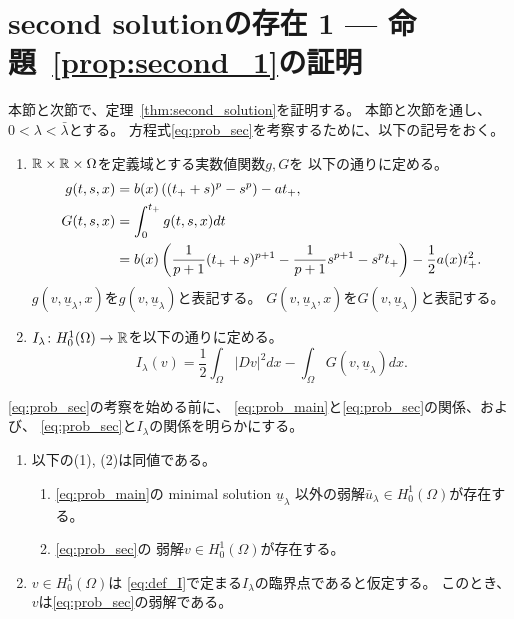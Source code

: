 \section{second solutionの存在 1 --- 命題~\ref{prop:second_1}の証明}

本節と次節で、定理~\ref{thm:second_solution}を証明する。
本節と次節を通し、$0 < \lambda < \bar{\lambda}$とする。
方程式\ref{eq:prob_sec}を考察するために、以下の記号をおく。

\begin{nota}
 \begin{enumerate}[1.]
  \item $\mathbb{R} \times \mathbb{R} \times \Omega$を定義域とする実数値関数$g, G$を
        以下の通りに定める。
        \begin{align}
         g(t, s, x) &= b(x) \left( (t_+ + s)^p - s^p \right) - a t_+, 
         \label{eq:def_g} \\
         G(t, s, x) &= \int_0^{t_+} g(t, s, x) dt
         \notag \\
         &= b(x) \left( \frac{1}{p+1} (t_+ + s)^{p+1} - \frac{1}{p+1}
         s^{p+1} - s^p t_+ \right) - \frac{1}{2} a(x) t_+^2.
         \label{eq:def_G}
        \end{align}
        $g(v, \underline{u}_\lambda, x)$を$g(v, \underline{u}_\lambda
        )$と表記する。
        $G(v,\underline{u}_\lambda, x)$を$G(v, \underline{u}_\lambda
        )$と表記する。
  \item $I_{\lambda} \colon H_0^1(\Omega) \to \mathbb{R}$を以下の通りに定める。
        \begin{equation}
         I_\lambda (v) = \frac{1}{2} \int_\Omega \lvert Dv \rvert^2 dx
          - \int_\Omega G(v, \underline{u}_\lambda) dx. \label{eq:def_I}
        \end{equation}
 \end{enumerate}
\end{nota}

\ref{eq:prob_sec}の考察を始める前に、
\ref{eq:prob_main}と\ref{eq:prob_sec}の関係、および、
\ref{eq:prob_sec}と$I_\lambda$の関係を明らかにする。

\begin{lem}
 \begin{enumerate}[1.]
  \item 以下の(1), (2)は同値である。
        \begin{enumerate}[(1)]
         \item \ref{eq:prob_main}の minimal solution $\underline{u}_\lambda$
               以外の弱解$\bar{u}_\lambda \in H_0^1(\Omega)$が存在する。
         \item \ref{eq:prob_sec}の
               弱解$v \in H_0^1(\Omega)$が存在する。
        \end{enumerate}
  \item $v \in H_0^1(\Omega)$は
        \eqref{eq:def_I}で定まる$I_\lambda$の臨界点であると仮定する。
        このとき、$v$は\ref{eq:prob_sec}の弱解である。
 \end{enumerate}
\end{lem}

